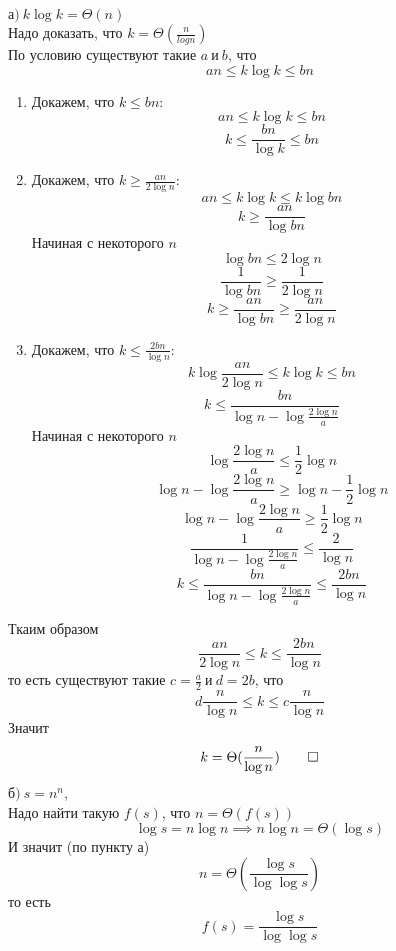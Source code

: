 \documentclass[12pt]{article}
\newcommand{\logn}[1][n]{\log #1}
\newcommand{\logk}[1][k]{\log #1}
\newcommand{\klogk}[1][k]{#1 \log #1}
\begin{document}
	\Large
	$а)\ k\logk = \Theta(n)$\\
	Надо доказать, что $k = \Theta(\frac{n}{logn})$\\
	По условию существуют такие $a\ и\ b$, что
	$$an \le \klogk \le bn$$
	\begin{enumerate}
	\item
	Докажем, что $k \le bn$:
		$$an \le \klogk \le bn$$
		$$k \le \frac{bn}{\logk} \le bn$$
	\item
	Докажем, что $k \ge \frac{an}{2\logn}$:
		$$an \le \klogk \le k\log bn$$
		$$k \ge \frac{an}{\log bn}$$
		Начиная с некоторого $n$
		$$\log bn \le 2\logn$$
		$$\frac{1}{\log bn} \ge \frac{1}{2\logn}$$
		$$k \ge \frac{an}{\log bn} \ge \frac{an}{2\logn}$$
	\newpage
	\item
		Докажем, что $k \le \frac{2bn}{\logn}$:
		$$k\log\frac{an}{2\logn} \le \klogk \le bn$$
		$$k \le \frac{bn}{\logn - \log\frac{2\logn}{a}}$$
		Начиная с некоторого $n$
		$$\log\frac{2\logn}{a} \le \frac{1}{2}\logn$$
		$$\logn - \log\frac{2\logn}{a} \ge \logn - \frac{1}{2}\logn$$
		$$\logn - \log\frac{2\logn}{a} \ge \frac{1}{2}\logn$$
		$$\frac{1}{\logn - \log\frac{2\logn}{a}} \le \frac{2}{\logn}$$
		$$k \le \frac{bn}{\logn - \log\frac{2\logn}{a}} \le \frac{2bn}{\logn}$$
	\end{enumerate}
	Ткаим образом
	$$\frac{an}{2\logn} \le k \le \frac{2bn}{\logn}$$
	то есть существуют такие $c = \frac{a}{2}\ и\ d = 2b$, что
	$$d\frac{n}{\logn} \le k \le c\frac{n}{\logn}$$
	Значит
	$$k = \Theta(\frac{n}{\logn}) \qed$$
	$б)\ s = n^n$,\\
	Надо найти такую $f(s)$, что $n = \Theta(f(s))$
	$$\log s = n\logn \implies n\logn = \Theta(\log s)$$
	И значит (по пункту а)
	$$n = \Theta(\frac{\log s}{\log\log s})$$
	то есть
	$$f(s) = \frac{\log s}{\log\log s}$$
\end{document}
